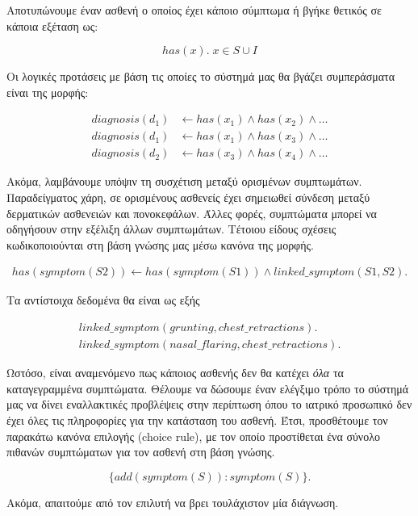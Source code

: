 \documentclass[10pt,leqno]{amsart}
\begin{document}
Αποτυπώνουμε έναν ασθενή ο οποίος έχει κάποιο σύμπτωμα ή βγήκε θετικός σε κάποια εξέταση ως: 

\begin{equation}
    has(x). \; x \in S \cup I
\end{equation}

Οι λογικές προτάσεις με βάση τις οποίες το σύστημά μας θα βγάζει συμπεράσματα είναι της μορφής: 

\begin{align}
    diagnosis(d_1) & \longleftarrow has(x_1) \land has(x_2) \land \dots \\
    diagnosis(d_1) & \longleftarrow has(x_1) \land has(x_3) \land \dots \\
    diagnosis(d_2) & \longleftarrow has(x_3) \land has(x_4) \land \dots
\end{align}

Ακόμα, λαμβάνουμε υπόψιν τη συσχέτιση μεταξύ ορισμένων συμπτωμάτων.
Παραδείγματος χάρη, σε ορισμένους ασθενείς έχει σημειωθεί σύνδεση  
μεταξύ δερματικών ασθενειών και πονοκεφάλων\cite{migraine-hives}.
Άλλες φορές, συμπτώματα μπορεί να οδηγήσουν στην εξέλιξη άλλων συμπτωμάτων.
Τέτοιου είδους σχέσεις κωδικοποιούνται στη βάση γνώσης μας μέσω κανόνα της μορφής.

\begin{align}
    has(symptom(S2)) \longleftarrow has(symptom(S1)) \land linked\_symptom(S1, S2).
\end{align}

Τα αντίστοιχα δεδομένα θα είναι ως εξής

\begin{align}
    linked\_symptom(grunting, chest\_retractions).\\
    linked\_symptom(nasal\_flaring, chest\_retractions).
\end{align}

Ωστόσο, είναι αναμενόμενο πως κάποιος ασθενής δεν θα κατέχει \textit{όλα} τα καταγεγραμμένα συμπτώματα.
Θέλουμε να δώσουμε έναν ελέγξιμο τρόπο το σύστημά μας να δίνει εναλλακτικές προβλέψεις
στην περίπτωση όπου το ιατρικό προσωπικό δεν έχει όλες τις πληροφορίες για την κατάσταση του ασθενή.
Έτσι, προσθέτουμε τον παρακάτω κανόνα επιλογής (choice rule), με τον οποίο προστίθεται 
ένα σύνολο πιθανών συμπτώματων για τον ασθενή στη βάση γνώσης.

\begin{equation}
    \{ add(symptom(S)) : symptom(S) \}.
\end{equation}

Ακόμα, απαιτούμε από τον επιλυτή να βρει τουλάχιστον μία διάγνωση.
\end{document}
